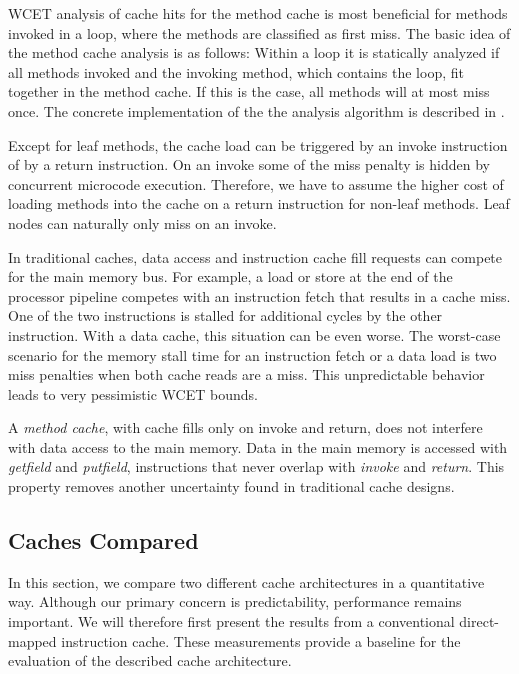 WCET analysis of cache hits for the method cache is most beneficial
for methods invoked in a loop, where the methods are classified as
first miss. The basic idea of the method cache analysis is as
follows: Within a loop it is statically analyzed if all methods
invoked and the invoking method, which contains the loop, fit
together in the method cache. If this is the case, all methods will
at most miss once. The concrete implementation of the the analysis
algorithm is described in \cite{master:huber:2009}.

Except for leaf methods, the cache load can be triggered by an invoke
instruction of by a return instruction. On an invoke some of the miss
penalty is hidden by concurrent microcode execution. Therefore, we
have to assume the higher cost of loading methods into the cache on a
return instruction for non-leaf methods. Leaf nodes can naturally
only miss on an invoke.

In traditional caches, data access and instruction cache fill
requests can compete for the main memory bus. For example, a load or
store at the end of the processor pipeline competes with an
instruction fetch that results in a cache miss. One of the two
instructions is stalled for additional cycles by the other
instruction. With a data cache, this situation can be even worse.
The worst-case scenario for the memory stall time for an instruction
fetch or a data load is two miss penalties when both cache reads are
a miss. This unpredictable behavior leads to very pessimistic WCET
bounds.

A \emph{method cache}, with cache fills only on invoke and return,
does not interfere with data access to the main memory. Data in the
main memory is accessed with \emph{getfield} and \emph{putfield},
instructions that never overlap with \emph{invoke} and
\emph{return}. This property removes another uncertainty found in
traditional cache designs.


\subsection{Caches Compared}

In this section, we compare two different cache architectures in a
quantitative way. Although our primary concern is predictability,
performance remains important. We will therefore first present the
results from a conventional direct-mapped instruction cache. These
measurements provide a baseline for the evaluation of the described
cache architecture.

